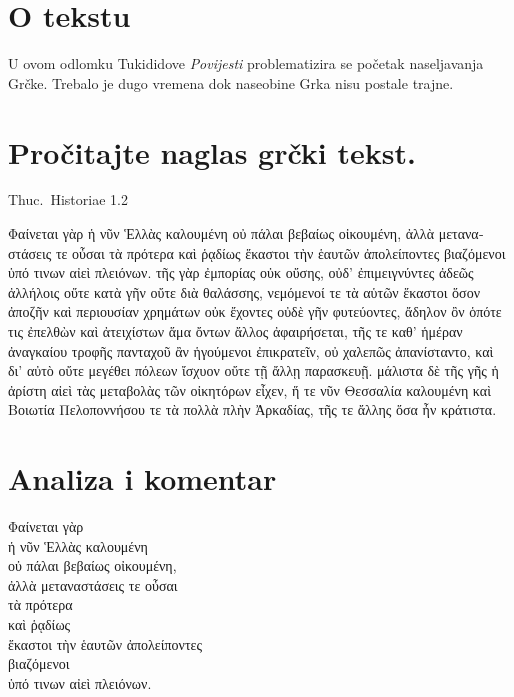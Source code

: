 

\section*{O tekstu}

U ovom odlomku Tukididove \textit{Povijesti} problematizira se početak naseljavanja Grčke. Trebalo je dugo vremena dok naseobine Grka nisu postale trajne.


\section*{Pročitajte naglas grčki tekst.}

Thuc.\ Historiae 1.2


\medskip

\begin{greek}
{\large
{ \noindent Φαίνεται γὰρ ἡ νῦν Ἑλλὰς καλουμένη οὐ πάλαι βεβαίως οἰκουμένη, ἀλλὰ μεταναστάσεις τε οὖσαι τὰ πρότερα καὶ ῥᾳδίως ἕκαστοι τὴν ἑαυτῶν ἀπολείποντες βιαζόμενοι ὑπό τινων αἰεὶ πλειόνων. τῆς γὰρ ἐμπορίας οὐκ οὔσης, οὐδ’ ἐπιμειγνύντες ἀδεῶς ἀλλήλοις οὔτε κατὰ γῆν οὔτε διὰ θαλάσσης, νεμόμενοί τε τὰ αὑτῶν ἕκαστοι ὅσον ἀποζῆν καὶ περιουσίαν χρημάτων οὐκ ἔχοντες οὐδὲ γῆν φυτεύοντες, ἄδηλον ὂν ὁπότε τις ἐπελθὼν καὶ ἀτειχίστων ἅμα ὄντων ἄλλος ἀφαιρήσεται, τῆς τε καθ’ ἡμέραν ἀναγκαίου τροφῆς πανταχοῦ ἂν ἡγούμενοι ἐπικρατεῖν, οὐ χαλεπῶς ἀπανίσταντο, καὶ δι’ αὐτὸ οὔτε μεγέθει πόλεων ἴσχυον οὔτε τῇ ἄλλῃ παρασκευῇ. μάλιστα δὲ τῆς γῆς ἡ ἀρίστη αἰεὶ τὰς μεταβολὰς τῶν οἰκητόρων εἶχεν, ἥ τε νῦν Θεσσαλία καλουμένη καὶ Βοιωτία Πελοποννήσου τε τὰ πολλὰ πλὴν Ἀρκαδίας, τῆς τε ἄλλης ὅσα ἦν κράτιστα.

}
}
\end{greek}

\section*{Analiza i komentar}


{\large
\begin{greek}
\noindent Φαίνεται γὰρ \\
\tabto{2em} ἡ νῦν Ἑλλὰς καλουμένη \\
\tabto{2em} οὐ πάλαι βεβαίως οἰκουμένη,\\
ἀλλὰ μεταναστάσεις τε οὖσαι \\
\tabto{2em} τὰ πρότερα \\
\tabto{2em} καὶ ῥᾳδίως \\
\tabto{3em} ἕκαστοι τὴν ἑαυτῶν ἀπολείποντες \\
\tabto{4em} βιαζόμενοι \\
\tabto{6em} ὑπό τινων αἰεὶ πλειόνων.\\

\end{greek}
}

